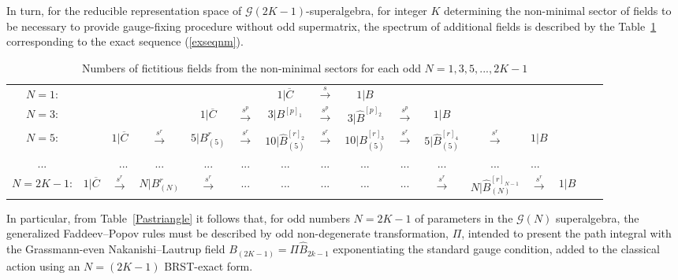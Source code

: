 \documentclass[10pt]{article}
\begin{document}
In turn,  for the reducible representation space of $\mathcal{G}(2K-1)$-superalgebra, for integer $K$ determining  the non-minimal sector of fields to be necessary to provide gauge-fixing procedure without odd supermatrix, the spectrum of additional fields is described by the Table~\ref{Pastrianglenmin} corresponding to the exact sequence (\ref{exseqnm}).
\begin{table}[b]
\begin{center}
{\footnotesize\begin{tabular}{ccrcc ccccc cc lccc}
$N=1$: &&& & && $1|\overline{C}$ &$\stackrel{{s}}{\to}$&$1|B$ &&&&&&\\
$N=3$:& &  && $1|\overline{C}$&$\stackrel{{s}{}^p}{\to}$&$3|B^{[p]_1}$&$\stackrel{{s}{}^p}{\to}$&$3|\widehat{B}^{[p]_2}$ &$\stackrel{{s}{}^p}{\to}$& $1|B$&&&&\\
$N=5$: && \hspace{-0.7em}$1|\overline{C}$&\hspace{-0.7em}$\stackrel{{s}{}^r}{\to}$& \hspace{-0.5em} $5|B_{(5)}^{r}$&$\stackrel{s{}^r}{\to}$&$10|\widehat{B}_{(5)}^{[r]_2}$&$\stackrel{s{}^r}{\to}$&$10|B_{(5)}^{[r]_3}$&$\stackrel{s{}^r}{\to}$&
$5|\widehat{B}_{(5)}^{[r]_4}$&\hspace{-0.7em}$\stackrel{s{}^r}{\to}$&\hspace{-0.9em}$1|B$&&\\
...&  & ... &\hspace{-0.5em} ... &\hspace{-0.5em} ...
&...&  ...&...& ... & ...&...&\hspace{-0.5em} ...&\hspace{-0.5em} ...&\hspace{-0.5em}&\\
$N=2K-1$:& $1|\overline{C}$ &$\stackrel{s{}^r}{\to}$&\hspace{-0.5em}$N|B_{(N)}^{r}$&\hspace{-0.5em}$\stackrel{s{}^r}{\to}$& ...&...&...&...&...&$\stackrel{s{}^r}{\to}$&\hspace{-0.5em}$N|\widehat{B}_{(N)}^{[r]_{N-1}}$ &\hspace{-0.5em}$\stackrel{s{}^r}{\to}$&\hspace{-0.5em}$1|B$&
\end{tabular}}
\end{center}
 \caption{Numbers of fictitious fields from the non-minimal sectors for each odd $N=1,3,5,...,2K-1$} \label{Pastrianglenmin}
\end{table}
In particular, from Table~\ref{Pastriangle} it follows that, for
odd numbers $N=2K-1$ of parameters in the $\mathcal{G}(N)$ superalgebra,
the generalized Faddeev--Popov rules must be described by odd non-degenerate transformation,
$\Pi$, intended to present the path integral with the Grassmann-even
Nakanishi--Lautrup field $B_{(2K-1)}=  \Pi\widehat{B}_{2k-1}$ exponentiating
the standard gauge condition, added to the classical action using
an $N=(2K-1)$ BRST-exact form.
\end{document}
